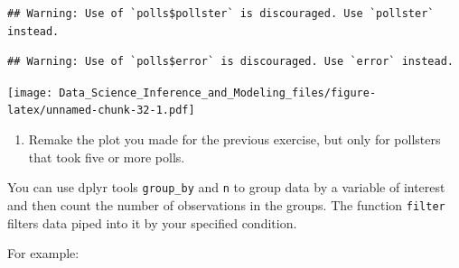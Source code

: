 \documentclass[
]{article}
\newenvironment{Shaded}{\begin{snugshade}}{\end{snugshade}}
\newcommand{\CommentTok}[1]{\textcolor[rgb]{0.56,0.35,0.01}{\textit{#1}}}
\newcommand{\DataTypeTok}[1]{\textcolor[rgb]{0.13,0.29,0.53}{#1}}
\newcommand{\DecValTok}[1]{\textcolor[rgb]{0.00,0.00,0.81}{#1}}
\newcommand{\FloatTok}[1]{\textcolor[rgb]{0.00,0.00,0.81}{#1}}
\newcommand{\KeywordTok}[1]{\textcolor[rgb]{0.13,0.29,0.53}{\textbf{#1}}}
\newcommand{\NormalTok}[1]{#1}
\newcommand{\OperatorTok}[1]{\textcolor[rgb]{0.81,0.36,0.00}{\textbf{#1}}}
\newcommand{\StringTok}[1]{\textcolor[rgb]{0.31,0.60,0.02}{#1}}
\providecommand{\tightlist}{%
  \setlength{\itemsep}{0pt}\setlength{\parskip}{0pt}}
\begin{document}
\begin{Shaded}
\end{Shaded}

\begin{verbatim}
## Warning: Use of `polls$pollster` is discouraged. Use `pollster` instead.
\end{verbatim}

\begin{verbatim}
## Warning: Use of `polls$error` is discouraged. Use `error` instead.
\end{verbatim}

\texttt{[image: Data\_Science\_Inference\_and\_Modeling\_files/figure-latex/unnamed-chunk-32-1.pdf]}

\begin{enumerate}
\def\labelenumi{\arabic{enumi}.}
\setcounter{enumi}{8}
\tightlist
\item
  Remake the plot you made for the previous exercise, but only for
  pollsters that took five or more polls.
\end{enumerate}

You can use dplyr tools \texttt{group\_by} and \texttt{n} to group data
by a variable of interest and then count the number of observations in
the groups. The function \texttt{filter} filters data piped into it by
your specified condition.

For example:
\end{document}
